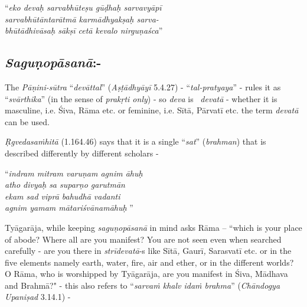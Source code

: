 \begin{centerquote}
“\textit{eko devaḥ sarvabhūteṣu gūḍhaḥ sarvavyāpī}\\ \textit{sarvabhūtāntarātmā karmādhyakṣaḥ sarva-}\\ \textit{bhūtādhivāsaḥ sākṣī cetā kevalo nirguṇaśca}”
\end{centerquote}

\vspace{-.3cm}

\subsection*{\textit{Saguṇopāsanā}:-}

The \textit{Pāṇini-sūtra} “\textit{devāttal}” (\textit{Aṣṭādhyāyī} 5.4.27) - “\textit{tal-pratyaya}” - rules it as “\textit{svārthika}” (in the sense of \textit{prakṛti only}) - so \textit{deva} is  \textit{devatā} - whether it is masculine, i.e. Śiva, Rāma etc. or feminine, i.e. Sītā\textit{,} Pārvatī etc. the term \textit{devatā} can be used. 

\textit{Ṛgvedasaṁhitā} (1.164.46) says that it is a single “\textit{sat}” (\textit{brahman}) that is described differently by different scholars -

\begin{centerquote}
“\textit{indram mitram varuṇam agnim āhuḥ}\\ \textit{atho divyaḥ sa suparṇo garutmān} \\ \textit{ekam sad viprā bahudhā vadanti}\\ \textit{agnim yamam mātariśvānamāhuḥ} ”
\end{centerquote}

Tyāgarāja, while keeping \textit{saguṇopāsanā} in mind asks Rāma – ``which is your place of abode? Where all are you manifest? You are not seen even when searched carefully - are you there in \textit{strīdevatā}-s like Sītā\textit{,} Gaurī\textit{,} Sarasvatī etc. or in the five elements namely earth, water, fire, air and ether, or in the different worlds? O Rāma, who is worshipped by Tyāgarāja, are you manifest in Śiva, Mādhava and Brahmā?" - this also refers to “\textit{sarvaṁ khalv idaṁ brahma}” (\textit{Chāndogya Upaniṣad} 3.14.1) - 

